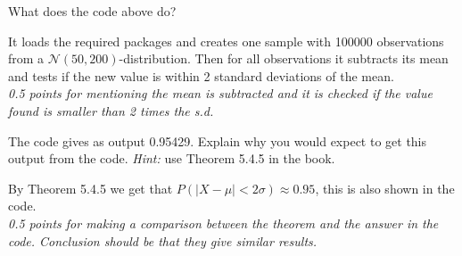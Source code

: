 \begin{exercise}[0.5]
What does the code above do?
\begin{solution}
It loads the required packages and creates one sample with 100000 observations from a $\mathcal{N}(50, 200)$-distribution. Then for all observations it subtracts its mean and tests if the new value is within 2 standard deviations of the mean. \\
\textit{0.5 points for mentioning the mean is subtracted and it is checked if the value found is smaller than 2 times the s.d.}
\end{solution}
\end{exercise}
\begin{exercise}[0.5]
The code gives as output 0.95429.
Explain why you would expect to get this output from the code. \textit{Hint:} use Theorem 5.4.5 in the book.
\begin{solution}
By Theorem 5.4.5 we get that $P(|X-\mu|<2\sigma) \approx 0.95$, this is also shown in the code. \\
\textit{0.5 points for making a comparison between the theorem and the answer in the code. Conclusion should be that they give similar results.}
\end{solution}
\end{exercise}